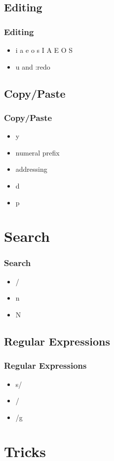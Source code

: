 \documentclass{beamer}
\begin{document}
\subsection{Editing}
\frame
{
    \frametitle{Editing}

    \begin{itemize}
        \item i a e o s I A E O S
        \item u and :redo
    \end{itemize}
}


\subsection{Copy/Paste}
\frame
{
    \frametitle{Copy/Paste}

    \begin{itemize}
        \item y
        \item numeral prefix
        \item addressing
        \item d
        \item p
    \end{itemize}
}
\section{Search}
\frame
{
    \frametitle{Search}

    \begin{itemize}
        \item /
        \item n
        \item N
    \end{itemize}
}

\subsection{Regular Expressions}
\frame
{
    \frametitle{Regular Expressions}

    \begin{itemize}
        \item s/
        \item /
        \item /g
    \end{itemize}
}

\section{Tricks}
\end{document}
